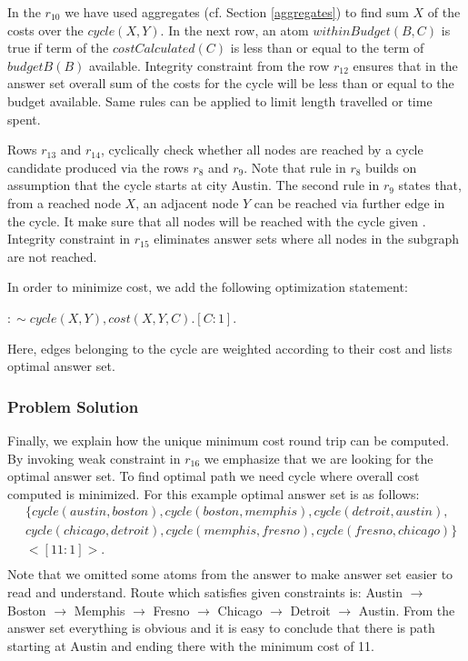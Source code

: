 \documentclass[14pt,a4paper, titlepage]{article}
\begin{document}
In the $r_{10}$ we have used aggregates (cf. Section 
\ref{aggregates}) to find sum $X$ of the costs over the 
$\mathit{cycle(X,Y)}$. In the next row, an atom 
$\mathit{withinBudget(B,C)}$ is true if term of the 
$\mathit{costCalculated(C)}$ is less than or equal to the 
term of $\mathit{budgetB(B)}$ available. Integrity 
constraint from the row $r_{12}$ ensures that in the answer 
set overall sum of the costs for the cycle will be less 
than or equal to the budget available. Same rules can be applied to limit length travelled or time spent.

Rows $r_{13}$ and $r_{14}$, cyclically check whether all 
nodes 
are reached by a cycle candidate produced via the rows 
$r_8$ and $r_9$.  Note that rule in $r_8$ builds on 
assumption that the cycle starts at city Austin. The second 
rule in $r_9$ states that, from a reached node $X$, an 
adjacent node $Y$ can be reached via further edge in the 
cycle. It make sure that all nodes will be reached with the 
cycle given \cite{pott}. Integrity constraint in $r_{15}$ 
eliminates answer sets where all nodes in the subgraph are 
not reached.

In order to minimize cost, we add the following 
optimization statement: \\
\centerline{$:\sim cycle(X,Y), cost(X,Y,C). [C:1].$}
Here, edges belonging to the cycle are weighted according 
to their cost and \dlvhex{} lists optimal answer set.

\subsubsection{Problem Solution}
Finally, we explain how the unique minimum cost round trip 
can be computed. By invoking weak constraint in $r_{16}$ we  
emphasize that we are looking for the optimal answer set. 
To find optimal path we need cycle where overall cost 
computed is minimized. For this example optimal answer set 
is as follows:
\begin{align*}
& \{ cycle(austin,boston), 
cycle(boston,memphis),cycle(detroit,austin), \\
& cycle(chicago,detroit), 
cycle(memphis,fresno),cycle(fresno,chicago) \} \\
& <[11:1]>. \\
\end{align*}
Note that we omitted some atoms from the answer to make 
answer set easier to read and understand. Route which satisfies given constraints is: Austin $\rightarrow$ Boston $\rightarrow$ Memphis $\rightarrow$ Fresno $\rightarrow$ Chicago $\rightarrow$ Detroit $\rightarrow$ Austin.
From the answer set everything is obvious and it is easy to 
conclude that there is path starting at Austin and ending 
there with the minimum cost of 11. 
\end{document}
